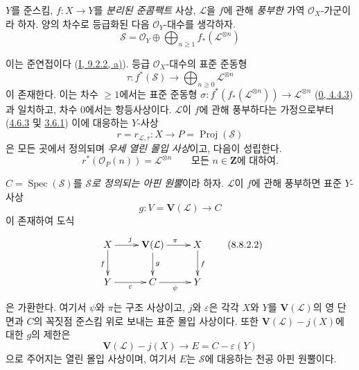 \begin{env}[8.8.1]
\label{II.8.8.1-ko}
$Y$를 준스킴, $f:X\to Y$를 \emph{분리된 준콤팩트} 사상,
$\mathcal{L}$을 $f$에 관해 \emph{풍부한} 가역
$\mathcal{O}_X$-가군이라 하자. 양의 차수로 등급화된 다음
$\mathcal{O}_Y$-대수를 생각하자.
\begin{equation}
\label{II.8.8.1.1-ko}
  \mathcal{S}=\mathcal{O}_Y\oplus
  \bigoplus_{n\geqslant 1}f_*(\mathcal{L}^{\otimes n})
\tag{8.8.1.1}
\end{equation}

이는 준연접이다 (\hyperref[I.9.2.2-ko]{I, 9.2.2, a)}). 등급
$\mathcal{O}_X$-대수의 표준 준동형
\begin{equation}
\label{II.8.8.1.2-ko}
  \tau:f^*(\mathcal{S})\longrightarrow
  \bigoplus_{n\geqslant 0}\mathcal{L}^{\otimes n}
\tag{8.8.1.2}
\end{equation}
이 존재한다. 이는 차수 $\geqslant 1$에서는 표준 준동형
$\sigma:f^*(f_*(\mathcal{L}^{\otimes n}))\to\mathcal{L}^{\otimes n}$
(\hyperref[0.4.4.3-ko]{0, 4.4.3})과 일치하고, 차수 $0$에서는 항등사상이다.
$\mathcal{L}$이 $f$에 관해 풍부하다는 가정으로부터
(\hyperref[II.4.6.3-ko]{4.6.3} 및 \hyperref[II.3.6.1-ko]{3.6.1})
이에 대응하는 $Y$-사상
\begin{equation}
\label{II.8.8.1.3-ko}
  r=r_{\mathcal{L},\tau}:X\longrightarrow
  P=\operatorname{Proj}(\mathcal{S})
\tag{8.8.1.3}
\end{equation}
은 모든 곳에서 정의되며 \emph{우세 열린 몰입 사상}이고, 다음이 성립한다.
\begin{equation}
\label{II.8.8.1.4-ko}
  r^*(\mathcal{O}_P(n))=\mathcal{L}^{\otimes n}
  \qquad\text{모든 }n\in\mathbf{Z}\text{에 대하여}.
\tag{8.8.1.4}
\end{equation}
\end{env}

\begin{proposition}[8.8.2]
\label{II.8.8.2-ko}
$C=\operatorname{Spec}(\mathcal{S})$를 \emph{$\mathcal{S}$로 정의되는
아핀 원뿔}이라 하자. $\mathcal{L}$이 $f$에 관해 풍부하면 표준
$Y$-사상
\begin{equation}
\label{II.8.8.2.1-ko}
  g:V=\mathbf{V}(\mathcal{L})\longrightarrow C
\tag{8.8.2.1}
\end{equation}
이 존재하여 도식
\begin{equation}
\label{II.8.8.2.2-ko}
  \xymatrix{
    X\ar[r]^{j}\ar[d]_{f} &
    \mathbf{V}(\mathcal{L})\ar[r]^{\pi}\ar[d]^{g} & X\ar[d]^{f}\\
    Y\ar[r]_{\varepsilon} & C\ar[r]_{\psi} & Y
  }
\tag{8.8.2.2}
\end{equation}
은 가환한다. 여기서 $\psi$와 $\pi$는 구조 사상이고, $j$와
$\varepsilon$은 각각 $X$와 $Y$를 $\mathbf{V}(\mathcal{L})$의 영 단면과
$C$의 꼭짓점 준스킴 위로 보내는 표준 몰입 사상이다. 또한
$\mathbf{V}(\mathcal{L})-j(X)$에 대한 $g$의 제한은
\begin{equation}
\label{II.8.8.2.3-ko}
  \mathbf{V}(\mathcal{L})-j(X)\longrightarrow
  E=C-\varepsilon(Y)
\tag{8.8.2.3}
\end{equation}
으로 주어지는 열린 몰입 사상이며, 여기서 $E$는 $\mathcal{S}$에
대응하는 천공 아핀 원뿔이다.
\end{proposition}


